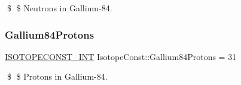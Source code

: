 \$ \$ Neutrons in Gallium-\/84. \mbox{\label{group___isotope_const-_gallium-_ga84_gae7420529c570c142fd28f229b4f91c4a}} 
\subsubsection{\texorpdfstring{Gallium84\+Protons}{Gallium84Protons}}
{\footnotesize\ttfamily \mbox{\hyperlink{group___isotope_const-_macros_ga5f18360b3e99483a35c32d789e62621c}{I\+S\+O\+T\+O\+P\+E\+C\+O\+N\+S\+T\+\_\+\+I\+NT}} Isotope\+Const\+::\+Gallium84\+Protons = 31}

\$ \$ Protons in Gallium-\/84. 